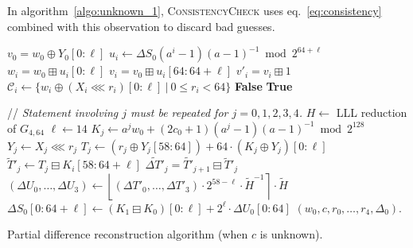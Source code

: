 \documentclass[submission,svgnames,journal=tosc]{iacrtrans}
\begin{document}
In algorithm~\ref{algo:unknown_1}, \textsc{ConsistencyCheck} uses
eq.~\eqref{eq:consistency} combined with this observation to discard bad guesses.



\begin{algorithm}
\begin{algorithmic}[1]
  \State $v_0 = w_0 \oplus Y_0[0:\ell]$ 
  \State $u_i \gets \Delta S_0 (a^i-1)(a-1)^{-1} \bmod 2^{64+\ell}$ 
  \State $w_i = w_0 \boxplus u_i[0:\ell]$ 
  \State $v_i = v_0 \boxplus u_i[64:64+\ell]$ 
  \State $v'_i = v_i \boxplus 1$
  \State $\mathcal{C}_i \gets \{ w_i \oplus (X_i \lll r_i)[0:\ell]~|~ 0\leq r_i < 64\}$ 
  \State \Return \textbf{False} 
  \EndIf
  \EndFor
  \State \Return \textbf{True} 
  \EndProcedure

\State 
  
  \State // \emph{Statement involving $j$ must be repeated for $j=0, 1, 2, 3, 4$.}
  \State $H \gets$ LLL reduction of $G_{4,64}$
  \State $\ell \gets 14$
 
\State $K_j \gets a^j w_0 + (2c_0 + 1)(a^j - 1)(a-1)^{-1} \bmod 2^{128}$ 
   
  \State $Y_j \gets X_j \lll r_j$ 
  \State $T_j \gets \left(r_j \oplus Y_j[58:64]\right) +  64 \cdot \left(K_j \oplus Y_j\right)[0:\ell]$ 
  \State $\widetilde{T}'_j \gets T_j \boxminus  K_i[58:64+\ell]$ 
  \State $\widetilde{\Delta T'}_j = \widetilde{T'}_{j+1} \boxminus \widetilde{T}'_j$  
  \State $(\Delta U_0, \dots, \Delta U_3) \gets \left\lfloor (\Delta T'_0, \dots, \Delta T'_3) \cdot 2^{58-\ell} \cdot \widetilde H^{-1} \right\rceil \cdot \widetilde H$ 
  \State $\Delta S_0[0:64+\ell] \gets \left(K_1 \boxminus K_0\right)[0:\ell]
  + 2^{\ell} \cdot \Delta U_0[0:64]$ 
  \State \Return $(w_0, c, r_0, \dots, r_4, \Delta_0)$.
  \EndIf
  \EndFor
  \EndFor
  \EndProcedure
\end{algorithmic}
\caption{Partial difference reconstruction algorithm (when $c$ is unknown).}
\label{algo:unknown_1}
\end{algorithm}
\end{document}
